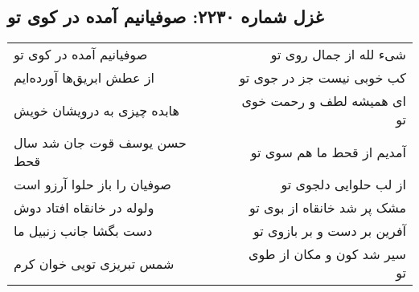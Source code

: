 \begin{center}
\section*{غزل شماره ۲۲۳۰: صوفیانیم آمده در کوی تو}
\label{sec:2230}
\begin{longtable}{l p{0.5cm} r}
صوفیانیم آمده در کوی تو
&&
شیء لله از جمال روی تو
\\
از عطش ابریق‌ها آورده‌ایم
&&
کب خوبی نیست جز در جوی تو
\\
هابده چیزی به درویشان خویش
&&
ای همیشه لطف و رحمت خوی تو
\\
حسن یوسف قوت جان شد سال قحط
&&
آمدیم از قحط ما هم سوی تو
\\
صوفیان را باز حلوا آرزو است
&&
از لب حلوایی دلجوی تو
\\
ولوله در خانقاه افتاد دوش
&&
مشک پر شد خانقاه از بوی تو
\\
دست بگشا جانب زنبیل ما
&&
آفرین بر دست و بر بازوی تو
\\
شمس تبریزی تویی خوان کرم
&&
سیر شد کون و مکان از طوی تو
\\
\end{longtable}
\end{center}
